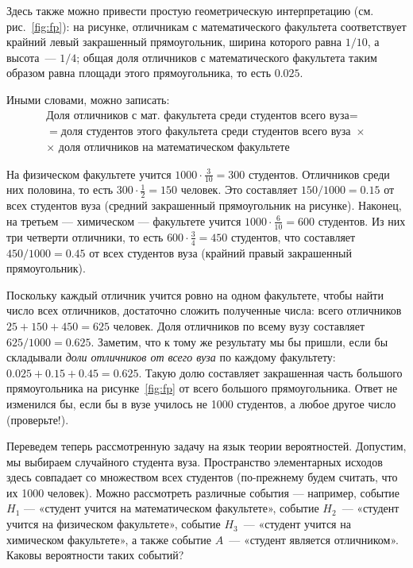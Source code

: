 \documentclass[11pt]{article}
\begin{document}
Здесь также можно привести простую геометрическую интерпретацию (см. рис.~\ref{fig:fp}): на рисунке, отличникам с математического факультета соответствует крайний левый закрашенный прямоугольник, ширина которого равна $1/10$, а высота~--- $1/4$; общая доля отличников с математического факультета таким образом равна площади этого прямоугольника, то есть $0.025$.

Иными словами, можно записать:
\begin{multline}\label{eq:doli}
	\text{Доля отличников с мат. факультета среди студентов всего вуза} = \\
	= \text{доля студентов этого факультета среди студентов всего вуза } \times \\
	\times \text{ доля отличников на математическом факультете}
\end{multline}

На физическом факультете учится $1000\cdot \frac{3}{10}=300$ студентов. Отличников среди них половина, то есть $300\cdot \frac{1}{2}=150$ человек. Это составляет $150/1000=0.15$ от всех студентов вуза (средний закрашенный прямоугольник на рисунке). Наконец, на третьем — химическом — факультете учится $1000\cdot \frac{6}{10}=600$ студентов. Из них три четверти отличники, то есть $600\cdot \frac{3}{4}=450$ студентов, что составляет $450/1000=0.45$ от всех студентов вуза (крайний правый закрашенный прямоугольник).

Поскольку каждый отличник учится ровно на одном факультете, чтобы найти число всех отличников, достаточно сложить полученные числа: всего отличников $25+150+450=625$ человек. Доля отличников по всему вузу составляет $625/1000=0.625$.  Заметим, что к тому же результату мы бы пришли, если бы складывали \emph{доли отличников от всего вуза} по каждому факультету: $0.025+0.15+0.45=0.625$. Такую долю составляет закрашенная часть большого прямоугольника на рисунке~\ref{fig:fp} от всего большого прямоугольника. Ответ не изменился бы, если бы в вузе училось не 1000 студентов, а любое другое число (проверьте!).

Переведем теперь рассмотренную задачу на язык теории вероятностей. Допустим, мы выбираем случайного студента вуза. Пространство элементарных исходов здесь совпадает со множеством всех студентов (по-прежнему будем считать, что их 1000 человек). Можно рассмотреть различные события — например, событие $H_1$ — «студент учится на математическом факультете», событие $H_2$~--- «студент учится на физическом факультете», событие $H_3$~--- «студент учится на химическом факультете», а также событие $A$~--- «студент является отличником». Каковы вероятности таких событий?
\end{document}

